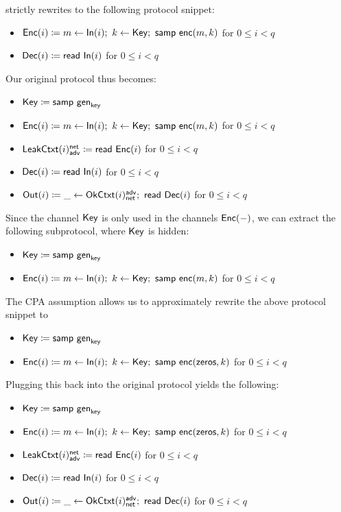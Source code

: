 \noindent strictly rewrites to the following protocol snippet:

\begin{itemize}
\item $\mathsf{Enc}(i) \coloneqq m \leftarrow \mathsf{In}(i); \ k \leftarrow \mathsf{Key}; \ \mathsf{samp} \ \mathsf{enc}(m,k)$ for $0 \leq i < q$
\item $\mathsf{Dec}(i) \coloneqq \mathsf{read} \ \mathsf{In}(i)$ for $0 \leq i < q$
\end{itemize}

\noindent Our original protocol thus becomes:

\begin{itemize}
\item $\mathsf{Key} \coloneqq \mathsf{samp} \ \mathsf{gen}_{\mathsf{key}}$
\item $\mathsf{Enc}(i) \coloneqq m \leftarrow \mathsf{In}(i); \ k \leftarrow \mathsf{Key}; \ \mathsf{samp} \ \mathsf{enc}(m,k)$ for $0 \leq i < q$
\item $\mathsf{LeakCtxt}(i)^{\mathsf{net}}_{\mathsf{adv}} \coloneqq \mathsf{read} \ \mathsf{Enc}(i)$ for $0 \leq i < q$
\item $\mathsf{Dec}(i) \coloneqq \mathsf{read} \ \mathsf{In}(i)$ for $0 \leq i < q$
\item $\mathsf{Out}(i) \coloneqq \_ \leftarrow \mathsf{OkCtxt}(i)^{\mathsf{adv}}_{\mathsf{net}}; \ \mathsf{read} \ \mathsf{Dec}(i)$ for $0 \leq i < q$
\end{itemize}

\noindent Since the channel $\mathsf{Key}$ is only used in the channels $\mathsf{Enc}(-)$, we can extract the following subprotocol, where $\mathsf{Key}$ is hidden:

\begin{itemize}
\item $\mathsf{Key} \coloneqq \mathsf{samp} \ \mathsf{gen}_{\mathsf{key}}$
\item $\mathsf{Enc}(i) \coloneqq m \leftarrow \mathsf{In}(i); \ k \leftarrow \mathsf{Key}; \ \mathsf{samp} \ \mathsf{enc}(m,k)$ for $0 \leq i < q$
\end{itemize}

\noindent The CPA assumption allows us to approximately rewrite the above protocol snippet to

\begin{itemize}
\item $\mathsf{Key} \coloneqq \mathsf{samp} \ \mathsf{gen}_{\mathsf{key}}$
\item $\mathsf{Enc}(i) \coloneqq m \leftarrow \mathsf{In}(i); \ k \leftarrow \mathsf{Key}; \ \mathsf{samp} \ \mathsf{enc}{(\mathsf{zeros},k)}$ for $0 \leq i < q$
\end{itemize}

\noindent Plugging this back into the original protocol yields the following:

\begin{itemize}
\item $\mathsf{Key} \coloneqq \mathsf{samp} \ \mathsf{gen}_{\mathsf{key}}$
\item $\mathsf{Enc}(i) \coloneqq m \leftarrow \mathsf{In}(i); \ k \leftarrow \mathsf{Key}; \ \mathsf{samp} \ \mathsf{enc}(\mathsf{zeros},k)$ for $0 \leq i < q$
\item $\mathsf{LeakCtxt}(i)^{\mathsf{net}}_{\mathsf{adv}} \coloneqq \mathsf{read} \ \mathsf{Enc}(i)$ for $0 \leq i < q$
\item $\mathsf{Dec}(i) \coloneqq \mathsf{read} \ \mathsf{In}(i)$ for $0 \leq i < q$
\item $\mathsf{Out}(i) \coloneqq \_ \leftarrow \mathsf{OkCtxt}(i)^{\mathsf{adv}}_{\mathsf{net}}; \ \mathsf{read} \ \mathsf{Dec}(i)$ for $0 \leq i < q$
\end{itemize}

